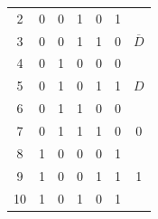 \begin{center}
\begin{tabular}{ccccccc}
\multicolumn{1}{c|}{2}                           & 0                         & 0                         & 1                         & \multicolumn{1}{c|}{0}                         & \multicolumn{1}{c|}{1}                             &                                  \\
\multicolumn{1}{c|}{3}                           & 0                         & 0                         & 1                         & \multicolumn{1}{c|}{1}                         & \multicolumn{1}{c|}{0}                             & \multirow{-2}{*}{$\overline{D}$} \\ \hline
\multicolumn{1}{c|}{4}                           & 0                         & 1                         & 0                         & \multicolumn{1}{c|}{0}                         & \multicolumn{1}{c|}{0}                             &                                  \\
\multicolumn{1}{c|}{5}                           & 0                         & 1                         & 0                         & \multicolumn{1}{c|}{1}                         & \multicolumn{1}{c|}{1}                             & \multirow{-2}{*}{$D$}            \\ \hline
\multicolumn{1}{c|}{6}                           & 0                         & 1                         & 1                         & \multicolumn{1}{c|}{0}                         & \multicolumn{1}{c|}{0}                             &                                  \\
\multicolumn{1}{c|}{7}                           & 0                         & 1                         & 1                         & \multicolumn{1}{c|}{1}                         & \multicolumn{1}{c|}{0}                             & \multirow{-2}{*}{0}              \\ \hline
\multicolumn{1}{c|}{8}                           & 1                         & 0                         & 0                         & \multicolumn{1}{c|}{0}                         & \multicolumn{1}{c|}{1}                             &                                  \\
\multicolumn{1}{c|}{9}                           & 1                         & 0                         & 0                         & \multicolumn{1}{c|}{1}                         & \multicolumn{1}{c|}{1}                             & \multirow{-2}{*}{1}              \\ \hline
\multicolumn{1}{c|}{10}                          & 1                         & 0                         & 1                         & \multicolumn{1}{c|}{0}                         & \multicolumn{1}{c|}{1}                             &                                  \\

\end{tabular}
\end{center}
